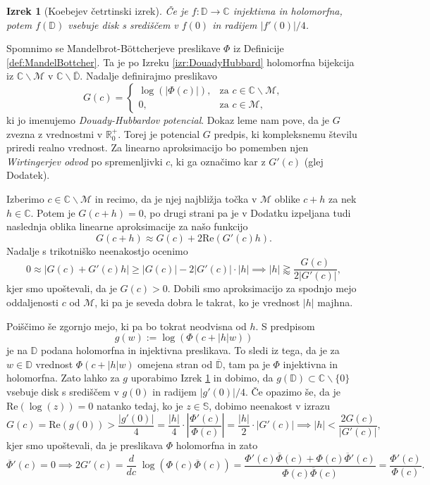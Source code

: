 \documentclass[12pt,a4paper]{amsart}
\theoremstyle{definition} %
\theoremstyle{plain} %
\newtheorem{izrek}[definicija]{Izrek}
\newcommand{\R}{\mathbb R}
\newcommand{\CC}{\mathbb C}
\newcommand{\D}{\mathbb D} %
\newcommand{\SSS}{\mathbb S} %
\newcommand{\M}{\mathscr M} %
\newcommand{\Real}{\mathrm{Re}}
\begin{document}
\begin{izrek}[Koebejev četrtinski izrek]\label{izr:Koebe}
Če je $f \colon \D \to \CC$ injektivna in holomorfna, potem 
$f(\D)$ vsebuje disk s središčem v $f(0)$ in radijem $|f'(0)| / 4$.
\end{izrek}

Spomnimo se Mandelbrot-B{\"o}ttcherjeve preslikave $\Phi$ iz Definicije \ref{def:MandelBottcher}.
Ta je po Izreku \ref{izr:DouadyHubbard} holomorfna bijekcija iz $\CC \smallsetminus \M$ v $\CC \smallsetminus \overline{\D}$.
Nadalje definirajmo preslikavo
\begin{equation*}
    G(c)= 
\begin{cases}
    \log(|\Phi(c)|), & \text{za } c \in \CC \smallsetminus \M, \\
    0,                   & \text{za } c \in \M,
\end{cases}
\end{equation*}
ki jo imenujemo {\em Douady-Hubbardov potencial}.
Dokaz leme  nam pove, da je $G$ zvezna z vrednostmi v $\R_0^+$.
Torej je potencial $G$ predpis, ki kompleksnemu številu priredi realno vrednost.
Za linearno aproksimacijo bo pomemben njen {\em Wirtingerjev odvod} po spremenljivki $c$, 
ki ga označimo kar z $G'(c)$ (glej Dodatek).

Izberimo $c \in \CC \smallsetminus \M$ in recimo, da je njej najbližja točka v $\M$ oblike $c + h$ za nek $h \in \CC$.
Potem je $G(c + h) = 0$,
po drugi strani pa je v Dodatku izpeljana tudi naslednja oblika linearne aproksimacije za našo funkcijo
$$G(c + h) \approx G(c) + 2\Real(G'(c)h).$$
Nadalje s trikotniško neenakostjo ocenimo
$$0 \approx |G(c) + G'(c)h| \geq |G(c)| - 2|G'(c)| \cdot |h| \implies |h| \gtrapprox \frac{G(c)}{2|G'(c)|},$$
kjer smo upoštevali, da je $G(c) > 0$.
Dobili smo aproksimacijo za spodnjo mejo oddaljenosti $c$ od $\M$,  ki pa je seveda dobra le takrat, ko je vrednost $|h|$ majhna.

Poiščimo še zgornjo mejo, ki pa bo tokrat neodvisna od $h$.
S predpisom 
$$g(w) := \log(\Phi(c + |h|w))$$
je na $\D$ podana holomorfna in injektivna preslikava.
To sledi iz tega, da je za $w \in \D$ vrednost $\Phi(c + |h|w)$ omejena stran od $\overline{\D}$, tam pa je $\Phi$ injektivna in holomorfna.
Zato lahko za $g$ uporabimo Izrek \ref{izr:Koebe} in dobimo, da $g(\D) \subset \CC\smallsetminus\{0\}$ vsebuje disk s središčem v $g(0)$ in radijem $|g'(0)| / 4$.
Če opazimo še, da je $\Real(\log(z)) = 0$ natanko tedaj, ko je $z \in \SSS$, dobimo neenakost v izrazu
$$G(c) = \Real(g(0)) > \frac{|g'(0)|}{4} = \frac{|h|}{4} \cdot \left|\frac{\Phi'(c)}{\Phi(c)}\right| 
= \frac{|h|}{2} \cdot |G'(c)| \implies |h| < \frac{2G(c)}{|G'(c)|},$$
kjer smo upoštevali, da je preslikava $\Phi$ holomorfna in zato
$$\overline{\Phi}'(c) = 0 \implies 2G'(c) = \frac{d}{dc} \; \log\left(\Phi(c)\overline{\Phi}(c)\right) 
= \frac{\Phi'(c)\overline{\Phi}(c) + \Phi(c) \overline{\Phi}'(c)}{\Phi(c)\overline{\Phi}(c)}
=\frac{\Phi'(c)}{\Phi(c)}.$$
\end{document}
